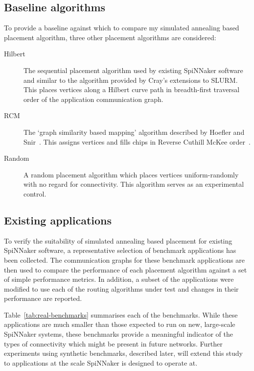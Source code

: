 		\subsection{Baseline algorithms}
			
			To provide a baseline against which to compare my simulated annealing
			based placement algorithm, three other placement algorithms are
			considered:
			
			\begin{description}
				
				\item[Hilbert] The sequential placement algorithm used by existing
				SpiNNaker software and similar to the algorithm provided by Cray's
				extensions to SLURM. This places vertices along a Hilbert curve path in
				breadth-first traversal order of the application communication graph.
				
				\item[RCM] The `graph similarity based mapping' algorithm described by
				Hoefler and Snir~\cite{hoefler11}. This assigns vertices and fills
				chips in Reverse Cuthill McKee order~\cite{cuthill69}.
				
				\item[Random] A random placement algorithm which places vertices
				uniform-randomly with no regard for connectivity. This algorithm serves
				as an experimental control.
				
			\end{description}
			
		\subsection{Existing applications}
			
			\label{sec:existing-applications}
			
			To verify the suitability of simulated annealing based placement for
			existing SpiNNaker software, a representative selection of benchmark
			applications has been collected. The communication graphs for these
			benchmark applications are then used to compare the performance of each
			placement algorithm against a set of simple performance metrics. In
			addition, a subset of the applications were modified to use each of the
			routing algorithms under test and changes in their performance are
			reported.
			
			Table~\ref{tab:real-benchmarks} summarises each of the benchmarks. While
			these applications are much smaller than those expected to run on new,
			large-scale SpiNNaker systems, these benchmarks provide a meaningful
			indicator of the types of connectivity which might be present in future
			networks. Further experiments using synthetic benchmarks, described
			later, will extend this study to applications at the scale SpiNNaker is
			designed to operate at.
			
